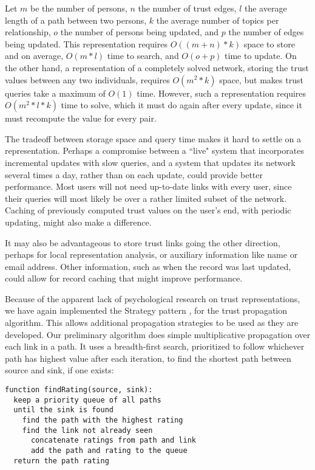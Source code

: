 \documentclass{acm_proc_article-sp}
\begin{document}
Let $m$ be the number of persons, $n$ the number of trust edges, $l$ the average length of a path between two persons, $k$ the average number of topics per relationship, $o$ the number of persons being updated, and $p$ the number of edges being updated.  This representation requires $O((m+n)*k)$ space to store and on average, $O(m*l)$ time to search, and $O(o+p)$ time to update.  On the other hand, a representation of a completely solved network, storing the trust values between any two individuals, requires $O(m^2*k)$ space, but makes trust queries take a maximum of $O(1)$ time.  However, such a representation requires $O(m^2*l*k)$ time to solve, which it must do again after every update, since it must recompute the value for every pair.  

The tradeoff between storage space and query time makes it hard to settle on a representation.  Perhaps a compromise between a ``live" system that incorporates incremental updates with slow queries, and a system that updates its network several times a day, rather than on each update, could provide better performance.  Most users will not need up-to-date links with every user, since their queries will most likely be over a rather limited subset of the network.  Caching of previously computed trust values on the user's end, with periodic updating, might also make a difference.

It may also be advantageous to store trust links going the other direction, perhaps for local representation analysis, or auxiliary information like name or email address.  Other information, such as when the record was last updated, could allow for record caching that might improve performance.

Because of the apparent lack of psychological research on trust representations, we have again implemented the Strategy pattern \citep{designPatterns}, for the trust propagation algorithm.  This allows additional propagation strategies to be used as they are developed.  Our preliminary algorithm does simple multiplicative propagation over each link in a path.  It uses a breadth-first search, prioritized to follow whichever path has highest value after each iteration, to find the shortest path between source and sink, if one exists:

\begin{verbatim}
function findRating(source, sink):
  keep a priority queue of all paths
  until the sink is found
    find the path with the highest rating
    find the link not already seen
      concatenate ratings from path and link
      add the path and rating to the queue
  return the path rating
\end{verbatim}
\end{document}

